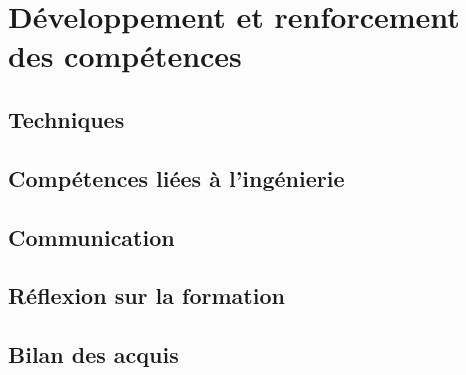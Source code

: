 \section{Développement et renforcement des compétences}

\subsection{Techniques}

\subsection{Compétences liées à l'ingénierie}

\subsection{Communication}

\subsection{Réflexion sur la formation}

\subsection{Bilan des acquis}
